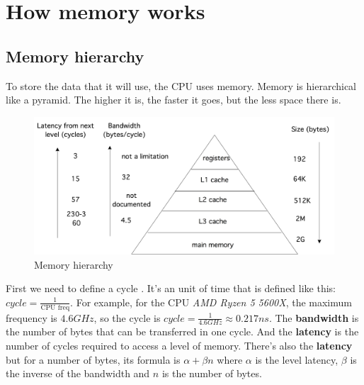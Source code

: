 \documentclass[12pt, openany]{report}
\theoremstyle{definition}
\begin{document}
\section{How memory works}
\subsection{Memory hierarchy} 
To store the data that it will use, the CPU uses memory. Memory is hierarchical like a pyramid. The higher it is, the faster it goes, but the less space there is.
\begin{figure}[H]
    \centering
    \includegraphics[scale=0.15]{img/memory_layout.jpeg}
    \caption{Memory hierarchy}
    \label{fig:memory_hierarchy}
\end{figure}
First we need to define a cycle \label{cycle_def}. It's an unit of time that is defined like this: $cycle = \frac{1}{\text{CPU freq}}$. For example, for the CPU \textit{AMD Ryzen 5 5600X}, the maximum frequency is $4.6 GHz$, so the cycle is $cycle = \frac{1}{4.6 GHz} \approx 0.217 ns$. The \textbf{bandwidth} is the number of bytes that can be transferred in one cycle. And the \textbf{latency} is the number of cycles required to access a level of memory. There's also the \textbf{latency} \label{def_latency} but for a number of bytes, its formula is $\alpha + \beta n$ where $\alpha$ is the level latency, $\beta$ is the inverse of the bandwidth and $n$ is the number of bytes.\\
\end{document}
